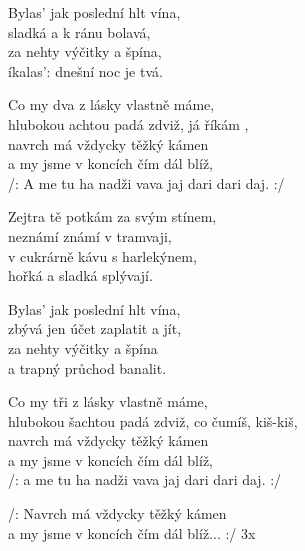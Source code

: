 
\ve{}
Bylas' jak poslední hlt vína,\\
sladká a k ránu bolavá,\\
za nehty výčitky a špína,\\
íkalas': dnešní noc je tvá.

\cho{}
Co my dva z lásky vlastně máme,\\
hlubokou achtou padá zdviž, já říkám ,\\
navrch má vždycky těžký kámen\\
a my jsme v koncích čím dál blíž,\\
/: A me tu ha nadži vava jaj dari dari daj. :/

\ve {}
Zejtra tě potkám za svým stínem,\\
neznámí známí v tramvaji,\\
v cukrárně kávu s harlekýnem,\\
hořká a sladká splývají.

\cho{}

\ve{}
Bylas' jak poslední hlt vína,\\
zbývá jen účet zaplatit a jít,\\
za nehty výčitky a špína\\
a trapný průchod banalit.

\cho{}
Co my tři z lásky vlastně máme,\\
hlubokou šachtou padá zdviž, co čumíš, kiš-kiš,\\
navrch má vždycky těžký kámen\\
a my jsme v koncích čím dál blíž,\\
/: a me tu ha nadži vava jaj dari dari daj. :/

\re{*:}
/: Navrch má vždycky těžký kámen\\
a my jsme v koncích čím dál blíž... :/ 3x

\esong